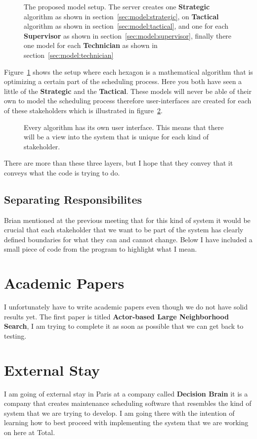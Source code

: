 \begin{figure}[H]
	\centering
    \drawModelSetupHexagon[userinterface=false, persistence=false, metaheuristics=true]
	\caption{The proposed model setup. The server creates one \textbf{Strategic} algorithm as shown in section~\ref{sec:model:strategic}, 
	on \textbf{Tactical} algorithm as shown in section~\ref{sec:model:tactical}, and 
	one for each \textbf{Supervisor} as shown in section~\ref{sec:model:supervisor}, 
	finally there one model for each \textbf{Technician} as shown in section~\ref{sec:model:technician}}
	\label{fig:hexagon:metaheuristics}
\end{figure}
Figure~\ref{fig:hexagon:metaheuristics} 
shows the setup where each hexagon is a mathematical algorithm that is optimizing
a certain part of the scheduling process. Here you both have seen a little of the \textbf{Strategic}
and the \textbf{Tactical}. These models will never be able of their own to model the scheduling process therefore user-interfaces are 
created for each of these stakeholders which is illustrated in figure~\ref{fig:hexagon:userinterfaces}.

\begin{figure}[H]
	\centering
    \drawModelSetupHexagon[userinterface=true, persistence=false, metaheuristics=false]
	\caption{Every algorithm has its own user interface. This means that there will be a view into the system that is 
	unique for each kind of stakeholder.}
	\label{fig:hexagon:userinterfaces}
\end{figure}

There are more than these three layers, but I hope that they convey that it conveys what the code is trying to do.

\subsection{Separating Responsibilites}
Brian mentioned at the previous meeting that for this kind of system it would be crucial that
each stakeholder that we want to be part of the system has clearly defined boundaries for what
they can and cannot change. Below I have included a small piece of code from the program to 
highlight what I mean. 

\section{Academic Papers}
I unfortunately have to write academic papers even though we do not have solid results yet.
The first paper
is titled \textbf{Actor-based Large Neighborhood Search}, I am trying to complete it as 
soon as possible that we can get back to testing.

\section{External Stay}
I am going of external stay in Paris at a company called \textbf{Decision Brain} it is a 
company that creates maintenance scheduling software that resembles the kind of system 
that we are trying to develop. I am going there with the intention of learning how to
best proceed with implementing the system that we are working on here at Total.
